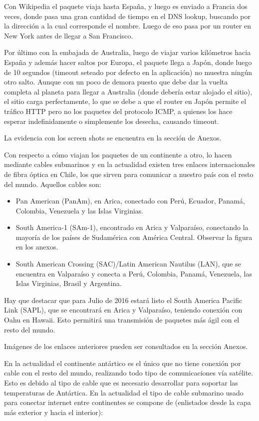 \documentclass{article}
\begin{document}
Con Wikipedia el paquete viaja hasta España, y luego es enviado a Francia dos veces, donde pasa una gran cantidad de tiempo en el DNS lookup, buscando por la dirección a la cual corresponde el nombre. Luego de eso pasa por un router en New York antes de llegar a San Francisco.

Por último con la embajada de Australia, luego de viajar varios kilómetros hacia España y además hacer saltos por Europa, el paquete llega a Japón, donde luego de 10 segundos (timeout seteado por defecto en la aplicación) no muestra ningún otro salto. Aunque con un poco de demora puesto que debe dar la vuelta completa al planeta para llegar a Australia (donde debería estar alojado el sitio), el sitio carga perfectamente, lo que se debe a que el router en Japón permite el tráfico HTTP pero no los paquetes del protocolo ICMP, a quienes los hace esperar indefinidamente o simplemente los desecha, causando timeout.

La evidencia con los screen shots se encuentra en la sección de Anexos.

Con respecto a cómo viajan los paquetes de un continente a otro, lo hacen mediante cables submarinos y en la actualidad existen tres enlaces internacionales de fibra óptica en Chile, los que sirven para comunicar a nuestro país con el resto del mundo. Aquellos cables son:
\begin{itemize}
\item Pan American (PanAm), en Arica, conectado con Perú, Ecuador, Panamá, Colombia, Venezuela y las Islas Virginias.
\item South America-1 (SAm-1), encontrado en Arica y Valparaíso, conectando la mayoría de los países de Sudamérica con América Central. Observar la figura en los anexos.
\item South American Crossing (SAC)/Latin American Nautilus (LAN), que se encuentra en Valparaíso y conecta a Perú, Colombia, Panamá, Venezuela, las Islas Virginias, Brasil y Argentina.
\end{itemize}
Hay que destacar que para Julio de 2016 estará listo el South America Pacific Link (SAPL), que se encontrará en Arica y Valparaíso, teniendo conexión con Oahu en Hawaii. Esto permitirá una transmisión de paquetes más ágil con el resto del mundo.

Imágenes de los enlaces anteriores pueden ser consultados en la sección Anexos.

En la actualidad el continente antártico es el único que no tiene conexión por cable con el resto del mundo, realizando todo tipo de comunicaciones vía satélite. Esto es debido al tipo de cable que es necesario desarrollar para soportar las temperaturas de Antártica. En la actualidad el tipo de cable submarino usado para conectar internet entre continentes se compone de (enlistados desde la capa más exterior y hacia el interior):
\end{document}
